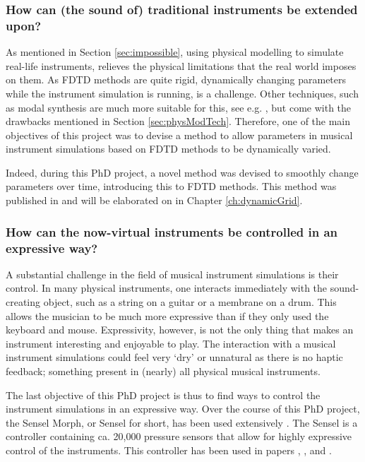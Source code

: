 \subsubsection{How can (the sound of) traditional instruments be extended upon?}
As mentioned in Section \ref{sec:impossible}, using physical modelling to simulate real-life instruments, relieves the physical limitations that the real world imposes on them.
As FDTD methods are quite rigid, dynamically changing parameters while the instrument simulation is running, is a challenge. Other techniques, such as modal synthesis are much more suitable for this, see e.g. \cite{Mehes2016, Willemsen2017}, but come with the drawbacks mentioned in Section \ref{sec:physModTech}. Therefore, one of the main objectives of this project was to devise a method to allow parameters in musical instrument simulations based on FDTD methods to be dynamically varied.

Indeed, during this PhD project, a novel method was devised to smoothly change parameters over time, introducing this to FDTD methods. This method was published in \citeP[G] and will be elaborated on in Chapter \ref{ch:dynamicGrid}.

\subsubsection{How can the now-virtual instruments be controlled in an expressive way?}
A substantial challenge in the field of musical instrument simulations is their control. In many physical instruments, one interacts immediately with the sound-creating object, such as a string on a guitar or a membrane on a drum. This allows the musician to be much more expressive than if they only used the keyboard and mouse. 
Expressivity, however, is not the only thing that makes an instrument interesting and enjoyable to play. The interaction with a musical instrument simulations could feel very `dry' or unnatural as there is no haptic feedback; something present in (nearly) all physical musical instruments. 

The last objective of this PhD project is thus to find ways to control the instrument simulations in an expressive way. 
Over the course of this PhD project, the Sensel Morph, or Sensel for short, has been used extensively  \cite{sensel}. The Sensel is a controller containing ca. 20,000 pressure sensors that allow for highly expressive control of the instruments. This controller has been used in papers \citeP[A], \citeP[B], \citeP[C] and \citeP[D].

